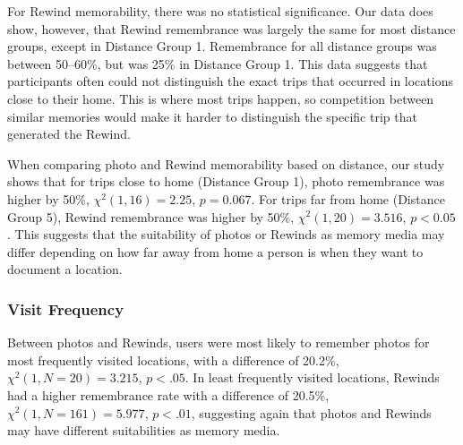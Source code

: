 \documentclass{sigchi}
\begin{document}
For Rewind memorability, there was no statistical significance. Our data does show, however, that Rewind remembrance was largely the same for most distance groups, except in Distance Group 1. Remembrance for all distance groups was between 50--60\%, but was 25\% in Distance Group 1. This data suggests that participants often could not distinguish the exact trips that occurred in locations close to their home. This is where most trips happen, so competition between similar memories would make it harder to distinguish the specific trip that generated the Rewind.

When comparing photo and Rewind memorability based on distance, our study shows that for trips close to home (Distance Group 1), photo remembrance was higher by 50\%, $\chi^2(1, 16) = 2.25$, $p = 0.067$. For trips far from home (Distance Group 5), Rewind remembrance was higher by 50\%, $\chi^2(1, 20) = 3.516$, $p < 0.05$. This suggests that the suitability of photos or Rewinds as memory media may differ depending on how far away from home a person is when they want to document a location. %

\subsubsection{Visit Frequency}

Between photos and Rewinds, users were most likely to remember photos for most frequently visited locations, with a difference of 20.2\%, $\chi^2(1, N=20) = 3.215$, $p < .05$. In least frequently visited locations, Rewinds had a higher remembrance rate with a difference of 20.5\%, $\chi^2(1, N=161) = 5.977$, $p < .01$, suggesting again that photos and Rewinds may have different suitabilities as memory media.
\end{document}
